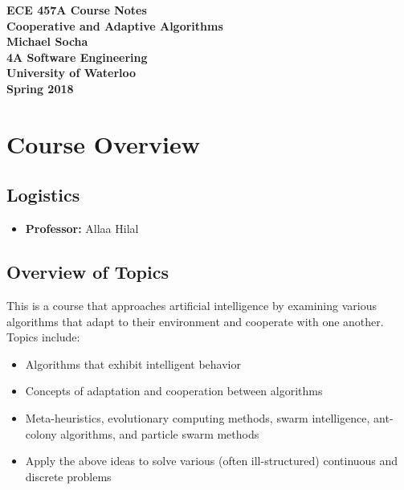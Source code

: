 \documentclass[12pt,titlepage]{article}
\begin{document}
  \begin{titlepage}
    \vspace*{\fill}
    \centering

    \textbf{\Huge ECE 457A Course Notes} \\ [0.4em]
    \textbf{\Large Cooperative and Adaptive Algorithms} \\ [1em]
    \textbf{\Large Michael Socha} \\ [1em]
    \textbf{\large 4A Software Engineering} \\
    \textbf{\large University of Waterloo} \\
    \textbf{\large Spring 2018} \\
    \vspace*{\fill}
  \end{titlepage}

  \newpage 


  \tableofcontents

  \newpage


  \section{Course Overview}
    \subsection{Logistics}
      \begin{itemize}
        \item \textbf{Professor:} Allaa Hilal
      \end{itemize}

    \subsection{Overview of Topics}
      This is a course that approaches artificial intelligence by examining various algorithms that adapt to their
      environment and cooperate with one another. Topics include:
      \begin{itemize}
        \item Algorithms that exhibit intelligent behavior
        \item Concepts of adaptation and cooperation between algorithms
        \item Meta-heuristics, evolutionary computing methods, swarm intelligence, ant-colony algorithms, and particle
        swarm methods
        \item Apply the above ideas to solve various (often ill-structured) continuous and discrete problems
      \end{itemize}
\end{document}
